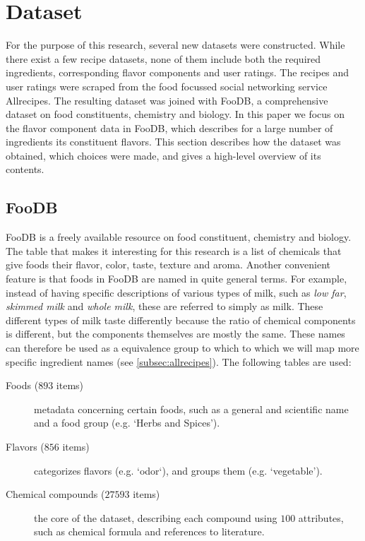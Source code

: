 \section{Dataset}
\label{sec:dataset}

For the purpose of this research, several new datasets were constructed.
While there exist a few recipe datasets, none of them include both the required ingredients, corresponding flavor components and user ratings.
The recipes and user ratings were scraped from the food focussed social networking service Allrecipes.
The resulting dataset was joined with FooDB, a comprehensive dataset on food constituents, chemistry and biology.
In this paper we focus on the flavor component data in FooDB, which  describes for a large number of ingredients its constituent flavors.
This section describes how the dataset was obtained, which choices were made, and gives a high-level overview of its contents.




\subsection{FooDB}
\label{subsec:foodb}

FooDB is a freely available resource on food constituent, chemistry and biology.
The table that makes it interesting for this research is a list of chemicals that give foods their flavor, color, taste, texture and aroma.
Another convenient feature is that foods in FooDB are named in quite general terms.
For example, instead of having specific descriptions of various types of milk, such as \emph{low far}, \emph{skimmed milk} and \emph{whole milk}, these are referred to simply as milk.
These different types of milk taste differently because the ratio of chemical components is different, but the components themselves are mostly the same.
These names can therefore be used as a equivalence group to which to which we will map more specific ingredient names (see \cref{subsec:allrecipes}).
The following tables are used:

\begin{description}
	\item [Foods ($893$ items)] metadata concerning certain foods, such as a general and scientific name and a food group (e.g. `Herbs and Spices').
	\item [Flavors ($856$ items)] categorizes flavors (e.g. `odor`), and groups them (e.g. `vegetable').
	\item [Chemical compounds ($\num{27593}$ items)] the core of the dataset, describing each compound using $100$ attributes, such as chemical formula and references to literature.
\end{description}


